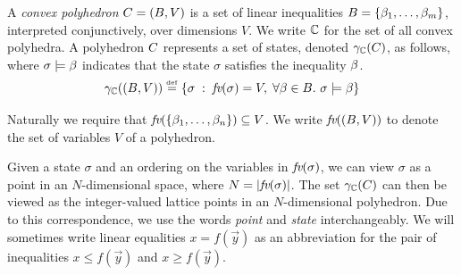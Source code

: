 \begin{definition}
  A \emph{convex polyhedron} $C = (B, V)$ is a set of linear inequalities
  $B = \{\beta_1,\ldots,\beta_m\}$, interpreted conjunctively,
  over dimensions $ V $.  We write
  $\mathbb{C}$ for the set of all convex polyhedra.   A polyhedron $C$
  represents a set of states, denoted $\gamma_{\mathbb{C}}(C)$, as follows, where $\sigma \models \beta$ indicates that the state $\sigma$ satisfies the inequality $\beta$.
\[\gamma_{\mathbb{C}}(\left( B,V \right)) \stackrel{\smash{\scriptscriptstyle \mathrm{def}}}= \{\sigma \;:\; \textit{fv}(\sigma) =
V,\; \forall \beta \in B.\ \sigma \models \beta\}\]

Naturally we require that $\textit{fv}(\{\beta_1,\ldots,\beta_n\}) \subseteq V
$. We write $ \textit{fv}(\left( B, V \right)) $ to denote the set of variables $
V $ of a polyhedron.

\end{definition}

Given a state $\sigma$ and an ordering on the variables in $\textit{fv}(\sigma)$, we can view $\sigma$ as a point in
an $N$-dimensional space, where $N = \left| \textit{fv}(\sigma) \right|$.  The set $\gamma_{\mathbb{C}}(C)$ can then be viewed as the integer-valued lattice points in an $N$-dimensional polyhedron.
Due to this correspondence, we use the words \textit{point} and
\textit{state} interchangeably.  We will sometimes write linear equalities $x = f(\vec{y})$ as an abbreviation for the pair of inequalities $x \leq f(\vec{y})$ and $x \geq f(\vec{y})$.

